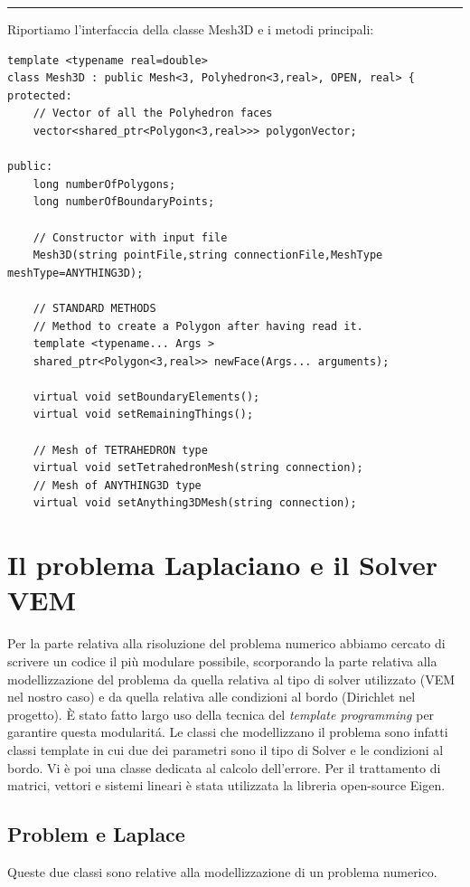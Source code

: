 \documentclass[oneside,12pt]{book}  %
\theoremstyle{plain}
\theoremstyle{definition}
\theoremstyle{remark}
\numberwithin{equation}{chapter} %
\begin{document}
\noindent\rule{14cm}{1pt}

Riportiamo l'interfaccia della classe Mesh3D e i metodi principali:

\begin{verbatim}
template <typename real=double>
class Mesh3D : public Mesh<3, Polyhedron<3,real>, OPEN, real> {
protected:
    // Vector of all the Polyhedron faces
    vector<shared_ptr<Polygon<3,real>>> polygonVector;  

public:
    long numberOfPolygons;
    long numberOfBoundaryPoints;

    // Constructor with input file
    Mesh3D(string pointFile,string connectionFile,MeshType meshType=ANYTHING3D);
	
    // STANDARD METHODS
    // Method to create a Polygon after having read it.
    template <typename... Args >
    shared_ptr<Polygon<3,real>> newFace(Args... arguments);

    virtual void setBoundaryElements();
    virtual void setRemainingThings();

    // Mesh of TETRAHEDRON type
    virtual void setTetrahedronMesh(string connection);
    // Mesh of ANYTHING3D type
    virtual void setAnything3DMesh(string connection);

\end{verbatim}

\section{Il problema Laplaciano e il Solver VEM}
\label{sec:solver}
Per la parte relativa alla risoluzione del problema numerico abbiamo
cercato di scrivere un codice il pi\`u modulare possibile, scorporando
la parte relativa alla modellizzazione del problema da quella relativa
al tipo di solver utilizzato (VEM nel nostro caso) e da quella
relativa alle condizioni al bordo (Dirichlet nel progetto). \`E stato fatto
largo uso della tecnica del \textit{template programming} per
garantire questa modularit\'a. 
Le classi che modellizzano il problema sono infatti classi template in
cui due dei parametri sono il tipo di Solver e le condizioni al bordo.
Vi \`e poi una classe dedicata al calcolo dell'errore.
Per il trattamento di matrici, vettori e sistemi lineari \`e stata
utilizzata la libreria open-source Eigen.

\subsection{Problem e Laplace}
Queste due classi sono relative alla modellizzazione di un problema
numerico. 
\end{document}
